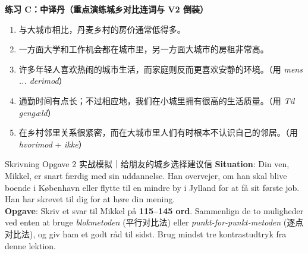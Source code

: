 \textbf{练习 C：中译丹（重点演练城乡对比连词与 V2 倒装）}
\begin{enumerate}
  \item 与大城市相比，丹麦乡村的房价通常低得多。
  \item 一方面大学和工作机会都在城市里，另一方面大城市的房租非常高。
  \item 许多年轻人喜欢热闹的城市生活，而家庭则反而更喜欢安静的环境。（用 \textit{mens ... derimod}）
  \item 通勤时间有点长；不过相应地，我们在小城里拥有很高的生活质量。（用 \textit{Til gengæld}）
  \item 在乡村邻里关系很紧密，而在大城市里人们有时根本不认识自己的邻居。（用 \textit{hvorimod} + \textit{ikke}）
\end{enumerate}


\begin{emailbox}{Skrivning Opgave 2 实战模拟｜给朋友的城乡选择建议信}
\textbf{Situation}: Din ven, Mikkel, er snart færdig med sin uddannelse. Han overvejer, om han skal blive boende i København eller flytte til en mindre by i Jylland for at få sit første job. Han har skrevet til dig for at høre din mening.\\
\textbf{Opgave}: Skriv et svar til Mikkel på \textbf{115--145 ord}. Sammenlign de to muligheder ved enten at bruge \textit{blokmetoden} (平行对比法) eller \textit{punkt-for-punkt-metoden} (逐点对比法), og giv ham et godt råd til sidst. Brug mindst tre kontrastudtryk fra denne lektion.
\end{emailbox}

